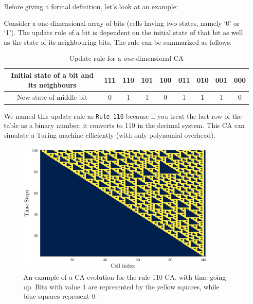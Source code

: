 \documentclass[11pt, oneside, listof=totoc]{scrbook}
\begin{document}
Before giving a formal definition, let's look at an example:
\begin{example}
    \label{eg:rule110}
    Consider a one-dimensional array of bits (\ie cells having two states, namely `0' or `1'). The update rule of a bit is dependent on the initial state of that bit as well as the state of its neighbouring bits. The rule can be summarized as follows:
    \begin{table}[H]
        \centering
        \begin{tabular}{ | c | c | c | c | c | c | c | c | c | }
            \hline
            Initial state of a bit and its neighbours & 111 & 110 & 101 & 100 & 011 & 010 & 001 & 000 \\
            \hline
            New state of middle bit                   & 0   & 1   & 1   & 0   & 1   & 1   & 1   & 0   \\
            \hline
        \end{tabular}
        \caption{Update rule for a \textit{one}-dimensional CA}
        \label{tab:rule110}
    \end{table}
    We named this update rule as \verb|Rule 110| because if you treat the last row of the table as a binary number, it converts to 110 in the decimal system. This CA can simulate a Turing machine efficiently (with only polynomial overhead).
    \begin{figure}[H]
        \centering
        \includegraphics[width = 0.9\textwidth]{rule110_cellular_automaton.png}
        \caption{An example of a CA evolution for the rule 110 CA, with time going up. Bits with value 1 are
            represented by the yellow squares, while blue squares represent 0.}
        \label{fig:rule110}
    \end{figure} \noindent

\end{example}
\end{document}
